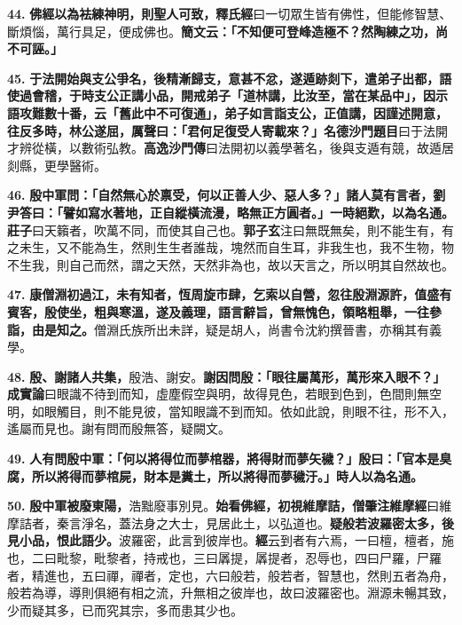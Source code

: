 \textbf{44.} \textbf{佛經以為袪練神明，則聖人可致，}{\footnotesize \textbf{釋氏經}曰一切眾生皆有佛性，但能修智慧、斷煩惱，萬行具足，便成佛也。}\textbf{簡文云：「不知便可登峰造極不？然陶練之功，尚不可誣。」}

\textbf{45.} \textbf{于法開始與支公爭名，後精漸歸支，意甚不忿，遂遁跡剡下，遣弟子出都，語使過會稽，于時支公正講小品，開戒弟子「道林講，比汝至，當在某品中」，因示語攻難數十番，云「舊此中不可復通」，弟子如言詣支公，正值講，因謹述開意，往反多時，林公遂屈，厲聲曰：「君何足復受人寄載來？」}{\footnotesize \textbf{名德沙門題目}曰于法開才辨從橫，以數術弘教。\textbf{高逸沙門傳}曰法開初以義學著名，後與支遁有競，故遁居剡縣，更學醫術。}

\textbf{46.} \textbf{殷中軍問：「自然無心於禀受，何以正善人少、惡人多？」諸人莫有言者，劉尹答曰：「譬如寫水著地，正自縱橫流漫，略無正方圓者。」一時絕歎，以為名通。}{\footnotesize \textbf{莊子}曰天籟者，吹萬不同，而使其自己也。\textbf{郭子玄}注曰無既無矣，則不能生有，有之未生，又不能為生，然則生生者誰哉，塊然而自生耳，非我生也，我不生物，物不生我，則自己而然，謂之天然，天然非為也，故以天言之，所以明其自然故也。}

\textbf{47.} \textbf{康僧淵初過江，未有知者，恆周旋市肆，乞索以自營，忽往殷淵源許，值盛有賓客，殷使坐，粗與寒溫，遂及義理，語言辭旨，曾無愧色，領略粗舉，一往參詣，由是知之。}{\footnotesize 僧淵氏族所出未詳，疑是胡人，尚書令沈約撰晉書，亦稱其有義學。}

\textbf{48.} \textbf{殷、謝諸人共集，}{\footnotesize 殷浩、謝安。}\textbf{謝因問殷：「眼往屬萬形，萬形來入眼不？」}{\footnotesize \textbf{成實論}曰眼識不待到而知，虛塵假空與明，故得見色，若眼到色到，色間則無空明，如眼觸目，則不能見彼，當知眼識不到而知。依如此說，則眼不往，形不入，遙屬而見也。謝有問而殷無答，疑闕文。}

\textbf{49.} \textbf{人有問殷中軍：「何以將得位而夢棺器，將得財而夢矢穢？」殷曰：「官本是臭腐，所以將得而夢棺屍，財本是糞土，所以將得而夢穢汙。」時人以為名通。}

\textbf{50.} \textbf{殷中軍被廢東陽，}{\footnotesize 浩黜廢事別見。}\textbf{始看佛經，初視維摩詰，}{\footnotesize \textbf{僧肇注維摩經}曰維摩詰者，秦言淨名，蓋法身之大士，見居此土，以弘道也。}\textbf{疑般若波羅密太多，後見小品，恨此語少。}{\footnotesize 波羅密，此言到彼岸也。\textbf{經}云到者有六焉，一曰檀，檀者，施也，二曰毗黎，毗黎者，持戒也，三曰羼提，羼提者，忍辱也，四曰尸羅，尸羅者，精進也，五曰禪，禪者，定也，六曰般若，般若者，智慧也，然則五者為舟，般若為導，導則俱絕有相之流，升無相之彼岸也，故曰波羅密也。淵源未暢其致，少而疑其多，已而究其宗，多而患其少也。}

